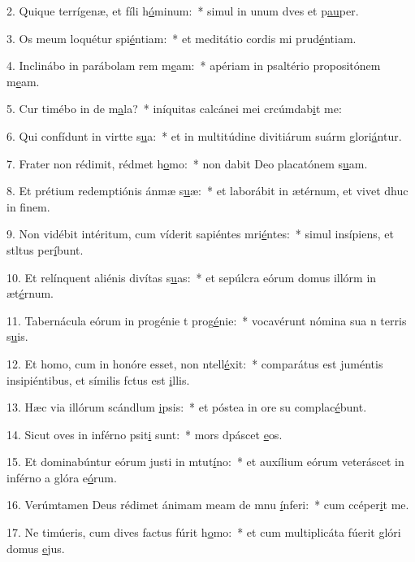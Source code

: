 2. Quique terrígenæ, et fíli h\uline{ó}minum:~* simul in unum dves et p\uline{au}per.\par 
3. Os meum loquétur spi\uline{é}ntiam:~* et meditátio cordis mi prud\uline{é}ntiam.\par 
4. Inclinábo in parábolam rem m\uline{e}am:~* apériam in psaltério propositónem m\uline{e}am.\par 
5. Cur timébo in de m\uline{a}la?~* iníquitas calcánei mei crcúmdab\uline{i}t me:\par 
6. Qui confídunt in virtte s\uline{u}a:~* et in multitúdine divitiárum suárm glori\uline{á}ntur.\par 
7. Frater non rédimit, rédmet h\uline{o}mo:~* non dabit Deo placatónem s\uline{u}am.\par 
8. Et prétium redemptiónis ánmæ s\uline{u}æ:~* et laborábit in ætérnum, et vivet dhuc in f\uline{i}nem.\par 
9. Non vidébit intéritum, cum víderit sapiéntes mri\uline{é}ntes:~* simul insípiens, et stltus per\uline{í}bunt.\par 
10. Et relínquent aliénis divítas s\uline{u}as:~* et sepúlcra eórum domus illórm in æt\uline{é}rnum.\par 
11. Tabernácula eórum in progénie t prog\uline{é}nie:~* vocavérunt nómina sua n terris s\uline{u}is.\par 
12. Et homo, cum in honóre esset, non ntell\uline{é}xit:~* comparátus est juméntis insipiéntibus, et símilis fctus est \uline{i}llis.\par 
13. Hæc via illórum scándlum \uline{i}psis:~* et póstea in ore su complac\uline{é}bunt.\par 
14. Sicut oves in inférno psit\uline{i} sunt:~* mors dpáscet \uline{e}os.\par 
15. Et dominabúntur eórum justi in mtut\uline{í}no:~* et auxílium eórum veteráscet in inférno a glóra e\uline{ó}rum.\par 
16. Verúmtamen Deus rédimet ánimam meam de mnu \uline{í}nferi:~* cum ccéper\uline{i}t me.\par 
17. Ne timúeris, cum dives factus fúrit h\uline{o}mo:~* et cum multiplicáta fúerit glóri domus \uline{e}jus.\par 
